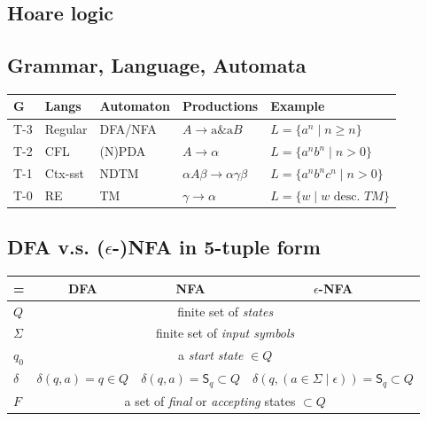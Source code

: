 \documentclass[10pt,a4paper,landscape]{article}
\newcommand{\gor}{\;|\;}
\begin{document}
\pagestyle{empty}

\begin{multicols*}{3}
\subsection*{Hoare logic}
% 
\subsection*{Grammar, Language, Automata}
{\footnotesize
\begin{tabular}{lp{1cm}p{1.2cm}ll}
  \hline
  G & Langs & Automaton & Productions & Example \\
  \hline
  T-3  & Regular    & DFA/NFA        & \(A \rightarrow \text{a} \& \text{a}B\) & \(L = \{a^{n}\gor n\geq n\}\)\\
  T-2  & CFL   & (N)PDA     & \(A \rightarrow \alpha\) & \(L = \{a^{n}b^{n}\gor n>0\}\)\\
  \textcolor{dmm}{T-1}  & \textcolor{dmm}{Ctx-sst} & \textcolor{dmm}{NDTM} & \textcolor{dmm}{\(\alpha A\beta \rightarrow \alpha\gamma\beta\)} & \textcolor{dmm}{\(L = \{a^{n}b^{n}c^{n}\gor n>0\}\)}\\
  T-0  & RE    & TM        & \(\gamma \rightarrow \alpha\) & \(L = \{w\gor w \text{ desc. } TM\}\)\\
\hline
\end{tabular}
}

\subsection*{DFA v.s. (\(\epsilon\)-)NFA in 5-tuple form}
{\footnotesize
\begin{tabular}{l|c|c|c}
  \hline
 = & DFA & NFA & \(\epsilon\)-NFA\\
  \hline
 \(Q\) & \multicolumn{3}{c}{finite set of \emph{states}}\\
  \hline
 \(\Sigma\) & \multicolumn{3}{c}{finite set of \emph{input symbols}}\\
  \hline
  \(q_{0}\) & \multicolumn{3}{c}{a \emph{start state} \(\in Q\) } \\
  \hline
  \(\delta\) & \(\delta(q,a) = q \in Q\) & \(\delta(q,a) = \mathsf{S}_{q} \subset Q\) & \(\delta(q,(a\in\Sigma\gor\epsilon)) = \mathsf{S}_{q} \subset Q\)\\
  \hline
 \(F\) & \multicolumn{3}{c}{a set of \emph{final} or \emph{accepting} states \(\subset Q\)}\\
\hline
\end{tabular}
}


\end{multicols*}
\end{document}
